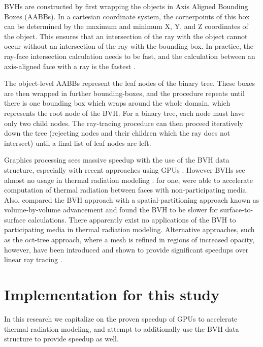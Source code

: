 BVHs are constructed by first wrapping the objects in Axis Aligned Bounding Boxes (AABBs). In a cartesian coordinate system, the cornerpoints of this box can be determined by the maximum and minimum X, Y, and Z coordinates of the object.
This ensures that an intersection of the ray with the object cannot occur without an intersection of the ray with the bounding box. 
In practice, the ray-face intersection calculation needs to be fast, and the calculation between an axis-aligned face with a ray is the fastest \cite{Kay1986RayScenes}.

The object-level AABBs represent the leaf nodes of the binary tree. These boxes are then wrapped in further bounding-boxes, and the procedure repeats until there is one bounding box which wraps around the whole domain, which represents the root node of the BVH. 
For a binary tree, each node must have only two child nodes. The ray-tracing procedure can then proceed iteratively down the tree (rejecting nodes and their children which the ray does not intersect) until a final list of leaf nodes are left.

Graphics processing sees massive speedup with the use of the BVH data structure, especially with recent approaches using GPUs \cite{Nery2013ParallelGPGPUs,Meister2021ATracing,Karras2012MaximizingTrees}.
However BVHs see almost no usage in thermal radiation modeling \cite{Liu2020TheFlames}.
\citet{Kuczynskia2014RadiationBoundaries} for one, were able to accelerate computation of thermal radiation between faces with non-participating media. 
Also, \citet{Mazumder2006MethodsTransport} compared the BVH approach with a spatial-partitioning approach known as volume-by-volume advancement and found the BVH to be slower for surface-to-surface calculations. 
There apparently exist no applications of the BVH to participating media in thermal radiation modeling. Alternative approaches, such as the oct-tree approach, where a mesh is refined in regions of increased opacity, however, have been introduced and shown to provide significant speedups over linear ray tracing \cite{Saftly2013UsingNote}.

\section{Implementation for this study} \label{section:ModelForThisStudy}
In this research we capitalize on the proven speedup of GPUs to accelerate thermal radiation modeling, and attempt to additionally use the BVH data structure to provide speedup as well.

